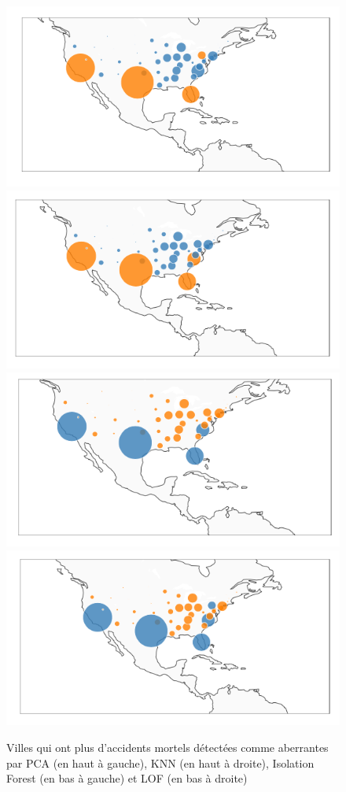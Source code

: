 \begin{figure}[ht]
    \centering
    \includegraphics[width=.45\textwidth]{ADOA/Images/FatPCA.png}
    \includegraphics[width=.450\textwidth]{ADOA/Images/FatKNN.png}\\
    \includegraphics[width=.45\textwidth]{ADOA/Images/FatIsofore.png}
    \includegraphics[width=.450\textwidth]{ADOA/Images/FatLOF.png}
    \caption{Villes qui ont plus d'accidents mortels détectées comme aberrantes par PCA (en haut à gauche), KNN (en haut à droite), Isolation Forest (en bas à gauche) et LOF (en bas à droite)}%
    \label{fig2b}
\end{figure}


\afterpage{\FloatBarrier}